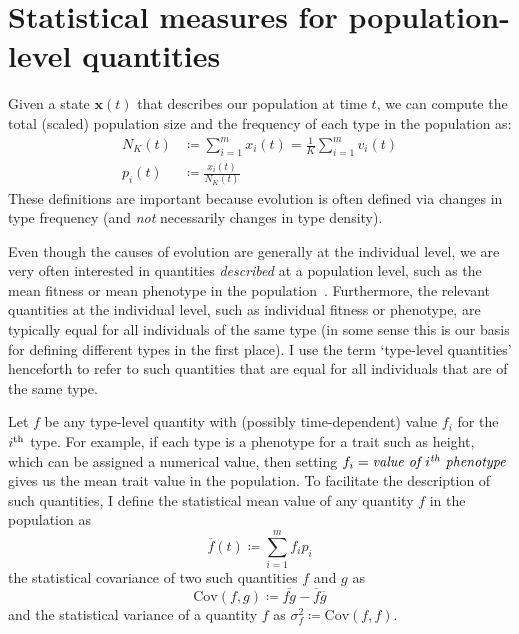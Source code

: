 \section{Statistical measures for population-level quantities}\label{sec_stat_measures}
Given a state $\mathbf{x}(t)$ that describes our population at time $t$, we can compute the total (scaled) population size and the frequency of each type in the population as:
\begin{equation}
\label{nD_tot_pop_and_prop_inds_defn}
\begin{aligned}
N_{K}(t) &\coloneqq \sum\limits_{i=1}^{m}x_i(t) = \frac{1}{K}\sum\limits_{i=1}^{m}v_i(t)\\
p_i(t) &\coloneqq \frac{x_i(t)}{N_{K}(t)}
\end{aligned}
\end{equation}
These definitions are important because evolution is often defined via changes in type frequency (and \emph{not} necessarily changes in type density).

Even though the causes of evolution are generally at the individual level, we are very often interested in quantities \emph{described} at a population level, such as the mean fitness or mean phenotype in the population~\citep{bourrat_evolution_2019}. Furthermore, the relevant quantities at the individual level, such as individual fitness or phenotype, are typically equal for all individuals of the same type (in some sense this is our basis for defining different types in the first place). I use the term `type-level quantities' henceforth to refer to such quantities that are equal for all individuals that are of the same type.

Let $f$ be any type-level quantity with (possibly time-dependent) value $f_i$ for the $i\textsuperscript{th}$ type. For example, if each type is a phenotype for a trait such as height, which can be assigned a numerical value, then setting $f_i = \textit{value of $i\textsuperscript{th}$ phenotype}$ gives us the mean trait value in the population. To facilitate the description of such quantities, I define the statistical mean value of any quantity $f$ in the population as
\begin{equation}
\label{nD_mean}
\overline{f}(t) \coloneqq \sum\limits_{i=1}^{m}f_ip_{i}
\end{equation}
the statistical covariance of two such quantities $f$ and $g$ as
\begin{equation}
\label{nD_cov}
\textrm{Cov}(f,g) \coloneqq \overline{fg} - \overline{f}\overline{g}
\end{equation}
and the statistical variance of a quantity $f$ as $\sigma^2_f \coloneqq \textrm{Cov}(f,f)$.

